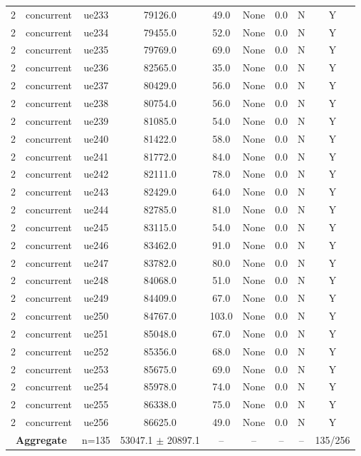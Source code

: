 \begin{table}[ht]
\begin{tabular}{|c|c|c|c|c|c|c|c|c|}
2 & concurrent & ue233 & 79126.0 & 49.0 & None & 0.0 & N & Y \\
2 & concurrent & ue234 & 79455.0 & 52.0 & None & 0.0 & N & Y \\
2 & concurrent & ue235 & 79769.0 & 69.0 & None & 0.0 & N & Y \\
2 & concurrent & ue236 & 82565.0 & 35.0 & None & 0.0 & N & Y \\
2 & concurrent & ue237 & 80429.0 & 56.0 & None & 0.0 & N & Y \\
2 & concurrent & ue238 & 80754.0 & 56.0 & None & 0.0 & N & Y \\
2 & concurrent & ue239 & 81085.0 & 54.0 & None & 0.0 & N & Y \\
2 & concurrent & ue240 & 81422.0 & 58.0 & None & 0.0 & N & Y \\
2 & concurrent & ue241 & 81772.0 & 84.0 & None & 0.0 & N & Y \\
2 & concurrent & ue242 & 82111.0 & 78.0 & None & 0.0 & N & Y \\
2 & concurrent & ue243 & 82429.0 & 64.0 & None & 0.0 & N & Y \\
2 & concurrent & ue244 & 82785.0 & 81.0 & None & 0.0 & N & Y \\
2 & concurrent & ue245 & 83115.0 & 54.0 & None & 0.0 & N & Y \\
2 & concurrent & ue246 & 83462.0 & 91.0 & None & 0.0 & N & Y \\
2 & concurrent & ue247 & 83782.0 & 80.0 & None & 0.0 & N & Y \\
2 & concurrent & ue248 & 84068.0 & 51.0 & None & 0.0 & N & Y \\
2 & concurrent & ue249 & 84409.0 & 67.0 & None & 0.0 & N & Y \\
2 & concurrent & ue250 & 84767.0 & 103.0 & None & 0.0 & N & Y \\
2 & concurrent & ue251 & 85048.0 & 67.0 & None & 0.0 & N & Y \\
2 & concurrent & ue252 & 85356.0 & 68.0 & None & 0.0 & N & Y \\
2 & concurrent & ue253 & 85675.0 & 69.0 & None & 0.0 & N & Y \\
2 & concurrent & ue254 & 85978.0 & 74.0 & None & 0.0 & N & Y \\
2 & concurrent & ue255 & 86338.0 & 75.0 & None & 0.0 & N & Y \\
2 & concurrent & ue256 & 86625.0 & 49.0 & None & 0.0 & N & Y \\
\multicolumn{2}{|c|}{\textbf{Aggregate}} & n=135 & 53047.1 $\pm$ 20897.1 & -- & -- & -- & -- & 135/256 \\

\end{tabular}
\end{table}
